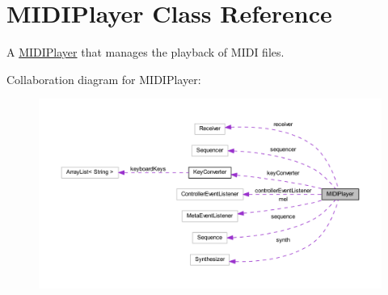 \hypertarget{classcom_1_1lclion_1_1midiplayer_1_1_m_i_d_i_player}{\section{M\+I\+D\+I\+Player Class Reference}
\label{classcom_1_1lclion_1_1midiplayer_1_1_m_i_d_i_player}
}


A \hyperlink{classcom_1_1lclion_1_1midiplayer_1_1_m_i_d_i_player}{M\+I\+D\+I\+Player} that manages the playback of M\+I\+D\+I files.  




Collaboration diagram for M\+I\+D\+I\+Player\+:\nopagebreak
\begin{figure}[H]
\begin{center}
\leavevmode
\includegraphics[width=350pt]{classcom_1_1lclion_1_1midiplayer_1_1_m_i_d_i_player__coll__graph}
\end{center}
\end{figure}
